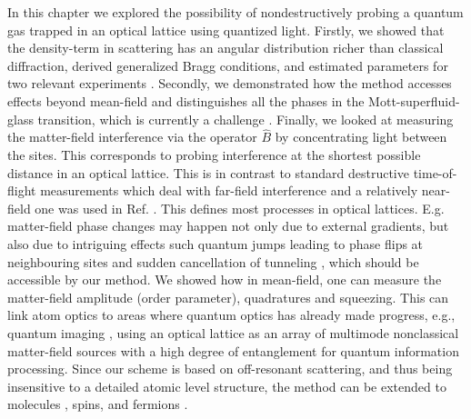 In this chapter we explored the possibility of nondestructively
probing a quantum gas trapped in an optical lattice using quantized
light. Firstly, we showed that the density-term in scattering has an
angular distribution richer than classical diffraction, derived
generalized Bragg conditions, and estimated parameters for two
relevant experiments \cite{weitenberg2011, miyake2011}. Secondly, we
demonstrated how the method accesses effects beyond mean-field and
distinguishes all the phases in the Mott-superfluid-glass transition,
which is currently a challenge \cite{derrico2014}. Finally, we looked
at measuring the matter-field interference via the operator $\hat{B}$
by concentrating light between the sites. This corresponds to probing
interference at the shortest possible distance in an optical
lattice. This is in contrast to standard destructive time-of-flight
measurements which deal with far-field interference and a relatively
near-field one was used in Ref. \cite{miyake2011}. This defines most
processes in optical lattices. E.g. matter-field phase changes may
happen not only due to external gradients, but also due to intriguing
effects such quantum jumps leading to phase flips at neighbouring
sites and sudden cancellation of tunneling \cite{vukics2007}, which
should be accessible by our method. We showed how in mean-field, one
can measure the matter-field amplitude (order parameter), quadratures
and squeezing. This can link atom optics to areas where quantum optics
has already made progress, e.g., quantum imaging \cite{golubev2010,
  kolobov1999}, using an optical lattice as an array of multimode
nonclassical matter-field sources with a high degree of entanglement
for quantum information processing. Since our scheme is based on
off-resonant scattering, and thus being insensitive to a detailed
atomic level structure, the method can be extended to molecules
\cite{LP2013}, spins, and fermions \cite{ruostekoski2009}.

